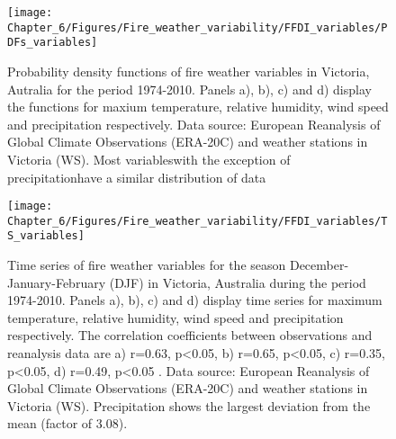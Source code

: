 \begin{figure}[h]
\noindent \begin{centering}
\texttt{[image: Chapter\_6/Figures/Fire\_weather\_variability/FFDI\_variables/PDFs\_variables]}
\par\end{centering}

\caption[Probability density functions of fire weather variables in Victoria,
Autralia for the period 1974-2010]{Probability density functions of fire weather variables in Victoria,
Autralia for the period 1974-2010. Panels a), b), c) and d) display
the functions for maxium temperature, relative humidity, wind speed
and precipitation respectively. Data source: European Reanalysis of
Global Climate Observations (ERA-20C) and weather stations in Victoria
(WS). Most variables\textemdash with the exception of precipitation\textemdash have
a similar distribution of data \label{fig:Probability density functions of fire weather variables in Victoria, Autralia for the period 1974-2010 (r)}}


\end{figure}


\begin{figure}[h]
\noindent \begin{centering}
\texttt{[image: Chapter\_6/Figures/Fire\_weather\_variability/FFDI\_variables/TS\_variables]}
\par\end{centering}

\caption[Time series of fire weather variables for the season December-January-February
(DJF) in Victoria, Australia during the period 1974-2010]{Time series of fire weather variables for the season December-January-February
(DJF) in Victoria, Australia during the period 1974-2010. Panels a),
b), c) and d) display time series for maximum temperature, relative
humidity, wind speed and precipitation respectively. The correlation
coefficients between observations and reanalysis data are a) r=0.63,
p<0.05, b) r=0.65, p<0.05, c) r=0.35, p<0.05, d) r=0.49, p<0.05 .
Data source: European Reanalysis of Global Climate Observations (ERA-20C)
and weather stations in Victoria (WS). Precipitation shows the largest
deviation from the mean (factor of 3.08). \label{fig:Time series of fire weather variables for the season December-January-February in Victoria, Australia during the period 1974-2010 (r)}}


\end{figure}


